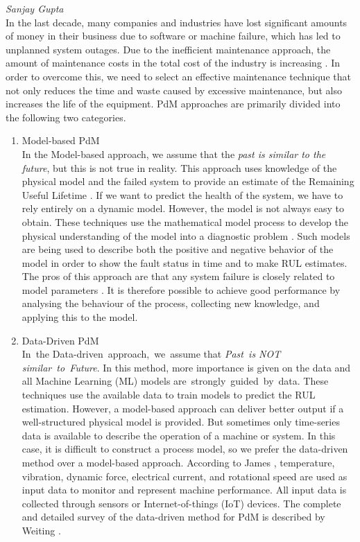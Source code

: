 \hfill{\normalsize\emph{Sanjay Gupta}} \\
In the last decade, many companies and industries have lost significant amounts of money in their business due to software or machine failure, which has led to unplanned system outages. Due to the inefficient maintenance approach, the amount of maintenance costs in the total cost of the industry is increasing \cite{DBLP:journals/sj/ZhangYW19}. In order to overcome this, we need to select an effective maintenance technique that not only reduces the time and waste caused by excessive maintenance, but also increases the life of the equipment. PdM approaches are primarily divided into the following two categories.
\begin{enumerate}
  \item Model-based PdM \\
        In the Model-based approach, we assume that the \textit{past is similar to the future}, but this is not true in reality. This approach uses knowledge of the physical model and the failed system to provide an estimate of the Remaining Useful Lifetime \cite{Roemer05anoverview, Schwabacher2005}. If we want to predict the health of the system, we have to rely entirely on a dynamic model. However, the model is not always easy to obtain. These techniques use the mathematical model process to develop the physical understanding of the model into a diagnostic problem \cite{Marjanović2011}. Such models are being used to describe both the positive and negative behavior of the model in order to show the fault status in time and to make RUL estimates. The pros of this approach are that any system failure is closely related to model parameters \cite{Marjanović2011}. It is therefore possible to achieve good performance by analysing the behaviour of the process, collecting new knowledge, and applying this to the model.
  \item Data-Driven PdM \\
        In the Data-driven approach, we assume that \textit{Past is NOT similar to Future}. In this method, more importance is given on the data and all Machine Learning (ML) models are strongly guided by data. These techniques use the available data to train models to predict the RUL estimation. However, a model-based approach can deliver better output if a well-structured physical model is provided. But sometimes only time-series data is available to describe the operation of a machine or system. In this case, it is difficult to construct a process model, so we prefer the data-driven method over a model-based approach. According to James \cite{DBLP:phd/dnb/Kimotho16}, temperature, vibration, dynamic force, electrical current, and rotational speed are used as input data to monitor and represent machine performance. All input data is collected through sensors or Internet-of-things (IoT) devices. The complete and detailed survey of the data-driven method for PdM is described by Weiting \cite{DBLP:journals/sj/ZhangYW19}.
\end{enumerate}

